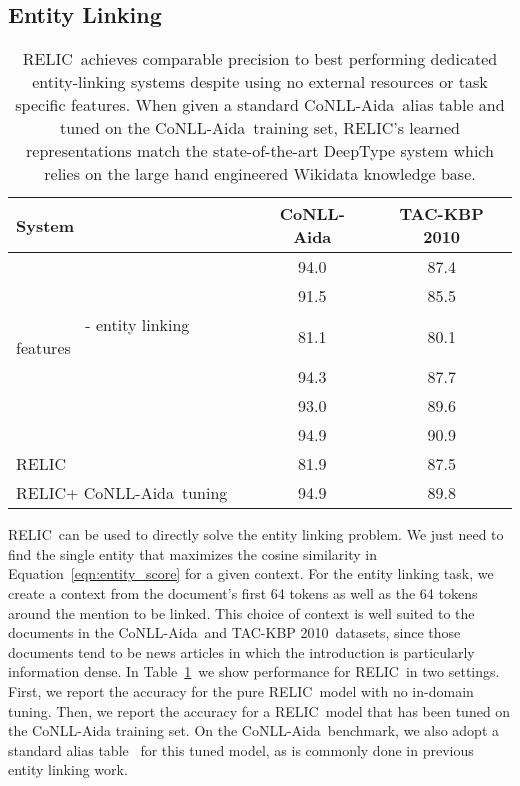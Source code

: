 \documentclass{article} \usepackage{iclr2020_conference,times}
\newcommand{\ack}{RELIC\xspace}
\newcommand{\tac}{TAC-KBP 2010}
\newcommand{\conll}{CoNLL-Aida}
\begin{document}
\subsection{Entity Linking} \label{sec:entity_linking_results}
\begin{table}[]
    \centering
    \begin{tabular}{|l|c|c|}
    \hline
    System & \conll & \tac \\\hline
    \citealt{Sil2018-qo} & 94.0 & 87.4 \\
    \citealt{yamada2016joint} & 91.5 &  85.5 \\ 
    ~~~~~~~~ - entity linking features & 81.1 & 80.1 \\
    \citealt{yamada-etal-2017-learning}& 94.3 & 87.7 \\
    \citealt{Radhakrishnan2018-zj} & 93.0 & 89.6 \\
    \citealt{Raiman2018-hm} & 94.9 & 90.9 \\
    \ack & 81.9 & 87.5 \\
    \ack + \conll~tuning & 94.9\footnotemark & 89.8 \\
    \hline
    \end{tabular}
    \caption{\ack~achieves comparable precision to best performing dedicated entity-linking systems despite using no external resources or task specific features. When given a standard \conll~alias table and tuned on the \conll~training set, \ack's learned representations match the state-of-the-art DeepType system which relies on the large hand engineered Wikidata knowledge base.}
    \label{tab:entity_linking}
\end{table}
\ack~can be used to directly solve the entity linking problem.
We just need to find the single entity that maximizes the cosine similarity in Equation~\ref{eqn:entity_score} for a given context.
For the entity linking task, we create a context from the document's first 64 tokens as well as the 64 tokens around the mention to be linked.
This choice of context is well suited to the documents in the \conll~and \tac~datasets, since those documents tend to be news articles in which the introduction is particularly information dense.
In Table~\ref{tab:entity_linking}~we show performance for \ack~in two settings. 
First, we report the accuracy for the pure \ack~model with no in-domain tuning.
Then, we report the accuracy for a \ack~model that has been tuned on the CoNLL-Aida training set. 
On the \conll~benchmark, we also adopt a standard alias table \citep{pprpershina}~for this tuned model, as is commonly done in previous entity linking work. 
\end{document}
